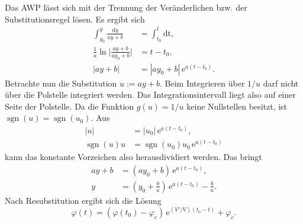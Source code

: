 \documentclass[a4paper,10pt,fleqn,twocolumn,twoside]{scrartcl}
\numberwithin{equation}{section}
\newcommand{\ee}{\mathrm e}
\newcommand{\sgn}{\operatorname{sgn}}
\begin{document}
Das AWP lässt sich mit der Trennung der Veränderlichen bzw.
der Substitutionsregel lösen. Es ergibt sich%
\begin{align}
\int_{y_0}^y \frac{\mathrm dy}{ay+b} &= \int_{t_0}^t\mathrm{dt},\\
\frac{1}{a}\ln\Big|\frac{ay+b}{ay_0+b}\Big| &= t-t_0,\\
|ay+b| &= |ay_0+b|\,\ee^{a(t-t_0)}.
\end{align}
Betrachte nun die Substitution $u:=ay+b$. Beim Integrieren über
$1/u$ darf nicht über die Polstelle integriert werden. Das
Integrationsintervall liegt also auf einer Seite der Polstelle.
Da die Funktion $g(u)=1/u$ keine Nullstellen besitzt, ist
$\sgn(u)=\sgn(u_0)$. Aus
\begin{align}
|u| &= |u_0|\,\ee^{a(t-t_0)},\\
\sgn(u)u &= \sgn(u_0)u_0\,\ee^{a(t-t_0)}
\end{align}
kann das konstante Vorzeichen also herausdividiert werden.
Das bringt
\begin{align}
ay+b &= (ay_0+b)\,\ee^{a(t-t_0)},\\
y &= (y_0+\tfrac{b}{a})\,\ee^{a(t-t_0)}-\tfrac{b}{a}.
\end{align}
Nach Resubstitution ergibt sich die Lösung
\begin{equation}
\varphi(t) = (\varphi(t_0)-\varphi_c)\,\ee^{(V'/V)(t_0-t)}+\varphi_c.
\end{equation}
\end{document}

